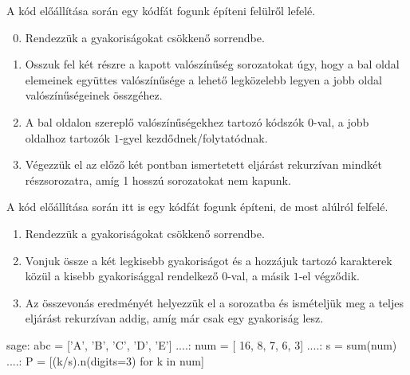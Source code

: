 \begin{definition}[\Wrap{content/magyar=Fano-kód, content/english=Fano-code}]
  A kód előállítása során egy kódfát fogunk építeni felülről lefelé.
  \begin{enumerate}
    \setcounter{enumi}{-1}
    \item Rendezzük a gyakoriságokat csökkenő sorrendbe.
    \item Osszuk fel két részre a kapott valószínűség sorozatokat úgy, hogy a bal oldal
      elemeinek együttes valószínűsége a lehető legközelebb legyen a jobb oldal valószínűségeinek
      összgéhez.
    \item A bal oldalon szereplő valószínűségekhez tartozó kódszók $0$-val, a jobb oldalhoz
      tartozók $1$-gyel kezdődnek/folytatódnak.
    \item Végezzük el az előző két pontban ismertetett eljárást rekurzívan mindkét részsorozatra,
      amíg 1 hosszú sorozatokat nem kapunk.
  \end{enumerate}
\end{definition}

\begin{definition}[\Wrap{content/magyar=Huffman-kód, content/english=Huffman-code}]
  A kód előállítása során itt is egy kódfát fogunk építeni, de most alúlról felfelé.
  \begin{enumerate}
    \item Rendezzük a gyakoriságokat csökkenő sorrendbe.
    \item Vonjuk össze a két legkisebb gyakoriságot és a hozzájuk tartozó karakterek közül a
      kisebb gyakorisággal rendelkező $0$-val, a másik $1$-el végződik.
    \item Az összevonás eredményét helyezzük el a sorozatba és ismételjük meg a teljes eljárást
      rekurzívan addig, amíg már csak egy gyakoriság lesz.
  \end{enumerate}
\end{definition}

\begin{sageexample}
  sage: abc = ['A', 'B', 'C', 'D', 'E']
  ....: num = [ 16,   8,   7,   6,   3]
  ....: s = sum(num)
  ....: P = [(k/s).n(digits=3) for k in num]
\end{sageexample}

\begin{table}[ht]
  \centering
\end{table}

